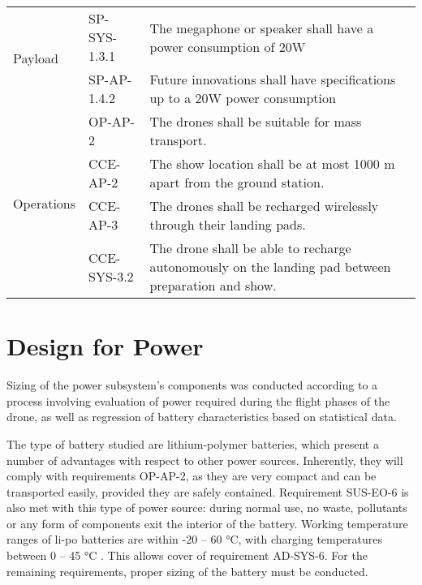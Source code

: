 \begin{table}[H]
\begin{tabular}{|p{2.7cm}|p{2cm}|p{10cm}|}
\multirow{2}{*}{Payload}  & SP-SYS-1.3.1  & The megaphone or speaker shall have a power consumption of 20W                                                               \\\cline{2-3} 
                          & SP-AP-1.4.2   & Future innovations shall have specifications up to a 20W power consumption   
                                                                    \\ \hline
\multirow{4}{*}{Operations}   & OP-AP-2	      & The drones shall be suitable for mass transport. \\ \cline{2-3}
                          & CCE-AP-2      & The show location shall be at most 1000 m apart from the ground station.                          \\\cline{2-3}
                        & CCE-AP-3     & The drones shall be recharged wirelessly through their landing pads.                       \\\cline{2-3}
                          & CCE-SYS-3.2      & The drone shall be able to recharge autonomously on the landing pad between preparation and show.           \\\hline

\end{tabular}%

\end{table}

\section{Design for Power}
\label{sec:powercalc}

Sizing of the power subsystem's components was conducted according to a process involving evaluation of power required during the flight phases of the drone, as well as regression of battery characteristics based on statistical data.

The type of battery studied are lithium-polymer batteries, which present a number of advantages with respect to other power sources. Inherently, they will comply with requirements OP-AP-2, as they are very compact and can be transported easily, provided they are safely contained. Requirement SUS-EO-6 is also met with this type of power source: during normal use, no waste, pollutants or any form of components exit the interior of the battery. Working temperature ranges of li-po batteries are within -20 -- 60 °C, with charging temperatures between 0 -- 45 °C \cite{simon_2019}. This allows cover of requirement AD-SYS-6. For the remaining requirements, proper sizing of the battery must be conducted.

